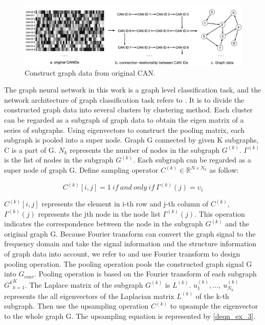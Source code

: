 \documentclass[lettersize,journal]{IEEEtran}
\begin{document}
\begin{figure}[!t]
\centering
\includegraphics[width=7in]{graph-data}
\caption{Construct graph data from original CAN.}
\label{fig_3}
\end{figure}

The graph neural network in this work is a graph level classification task, and the network architecture of graph classification task refers to \cite{19}. It is to divide the constructed graph data into several clusters by clustering method. Each cluster can be regarded as a subgraph of graph data to obtain the eigen matrix of a series of subgraphs. Using eigenvectors to construct the pooling matrix, each subgraph is pooled into a super node.  Graph G connected by given K subgraphs, C is a part of G. $N_k$ represents the number of nodes in the subgraph $G^{(k)}$. $\Gamma^{\left(k\right)}$ is the list of nodes in the subgraph $G^{(k)}$. Each subgraph can be regarded as a super node of graph G. Define sampling operator $C^{\left(k\right)}\in\mathbb{R}^{N\times N_k}$ as follow:

\begin{equation}
\label{deqn_ex_2}
C^{\left(k\right)}\left[i,j\right]=1\ if\ and\ only\ if\ \Gamma^{\left(k\right)}\left(j\right)=\upsilon_i
\end{equation}

$C^{\left(k\right)}\left[i,j\right]$ represents the element in i-th row and j-th column of $C^{\left(k\right)}$, $\Gamma^{\left(k\right)}\left(j\right)$ represents the jth node in the node list $\Gamma^{\left(k\right)}\left(j\right)$. This operation indicates the correspondence between the node in the subgraph $G^{(k)}$ and the original graph G. Because Fourier transform can convert the graph signal to the frequency domain and take the signal information and the structure information of graph data into account, we refer to \cite{19} and use Fourier transform to design pooling operation. The pooling operation pools the constructed graph signal G into $G_{coar}$. Pooling operation is based on the Fourier transform of each subgraph ${{G^k}}_{k=1}^K$. The Laplace matrix of the subgraph $G^{(k)}$ is $L^{(k)}$. $u_1^{(k)}, …, {\ u}_{N_k}^{(k)}$ represents the all eigenvectors of the Laplacian matrix $L^{(k)}$ of the k-th subgraph. Then use the upsampling operation $C^{(k)}$ to upsample the eigenvector to the whole graph G. The upsampling equation is represented by \eqref{deqn_ex_3}.
\end{document}
